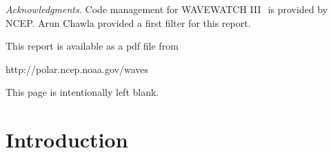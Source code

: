 \documentclass[12pt]{article}
\newcommand{\pstyle}{myheadings}
\newcommand{\ww}{WAVEWATCH III$\:$\texttrademark}
\newcommand{\pb}{\strut \vfill \pagebreak}
\newcommand{\bpagea}{\strut

\vspace{2.5in} \centerline{This page is intentionally left blank.}}
\newcommand{\newsec}{\setcounter{equation}{0}
                      \setcounter{myfigno}{0}
                      \setcounter{mytabno}{0}}
\newcounter{myfigno}[section]
\newcounter{mytabno}[section]
\begin{document}

\begin{abstract}
This report describes best practices for code development of \ww. This
includes guidelines for packaging of codes delivered by general users to NCEP
according to the \ww\ license, as well as instructions for co-developers on
the use of the subversion depository at NCEP. The report addresses codes,
documentation and manuals.
\end{abstract}

\vfill \pagebreak



{\it Acknowledgments.} Code management for \ww\ is provided by NCEP. Arun
Chawla provided a first filter for this report.

\vspace{\baselineskip} \noindent
This report is available as a pdf file from

\vspace{\baselineskip}
\centerline{http://polar.ncep.noaa.gov/waves}


\vfill \pagebreak

\tableofcontents

\pb
\pagestyle{empty}

\bpagea


\pb
\pagestyle{\pstyle}
\section{Introduction} \label{sec:intro}
\newsec
\end{document}
